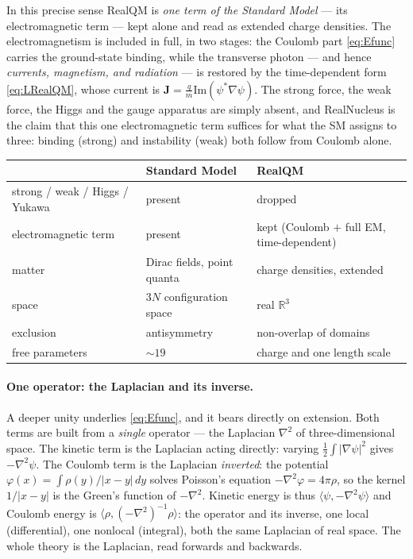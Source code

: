 \documentclass[11pt]{article}
\begin{document}
In this precise sense RealQM is \emph{one term of the Standard Model} --- its electromagnetic term ---
kept alone and read as extended charge densities. The electromagnetism is included in full, in two stages:
the Coulomb part \eqref{eq:Efunc} carries the ground-state binding, while the transverse photon --- and
hence \emph{currents, magnetism, and radiation} --- is restored by the time-dependent form
\eqref{eq:LRealQM}, whose current is $\mathbf J=\frac{q}{m}\mathrm{Im}(\psi^*\nabla\psi)$. The strong
force, the weak force, the Higgs and the gauge apparatus are simply absent, and RealNucleus is the claim
that this one electromagnetic term suffices for what the SM assigns to three: binding (strong) and
instability (weak) both follow from Coulomb alone.

\begin{center}
\small
\renewcommand{\arraystretch}{1.2}
\begin{tabular}{lll}
\hline
 & \textbf{Standard Model} & \textbf{RealQM} \\
\hline
strong / weak / Higgs / Yukawa & present & dropped \\
electromagnetic term & present & kept (Coulomb $+$ full EM, time-dependent) \\
matter & Dirac fields, point quanta & charge densities, extended \\
space & $3N$ configuration space & real $\mathbb R^3$ \\
exclusion & antisymmetry & non-overlap of domains \\
free parameters & ${\sim}19$ & charge and one length scale \\
\hline
\end{tabular}
\end{center}

\paragraph{One operator: the Laplacian and its inverse.} A deeper unity underlies \eqref{eq:Efunc}, and it
bears directly on extension. Both terms are built from a \emph{single} operator --- the Laplacian
$\nabla^2$ of three-dimensional space. The kinetic term is the Laplacian acting directly: varying
$\tfrac12\int|\nabla\psi|^2$ gives $-\nabla^2\psi$. The Coulomb term is the Laplacian \emph{inverted}: the
potential $\varphi(x)=\int\rho(y)/|x-y|\,dy$ solves Poisson's equation $-\nabla^2\varphi=4\pi\rho$, so the
kernel $1/|x-y|$ is the Green's function of $-\nabla^2$. Kinetic energy is thus
$\langle\psi,-\nabla^2\psi\rangle$ and Coulomb energy is $\langle\rho,(-\nabla^2)^{-1}\rho\rangle$: the
operator and its inverse, one local (differential), one nonlocal (integral), both the same Laplacian of
real space. The whole theory is the Laplacian, read forwards and backwards.
\end{document}
